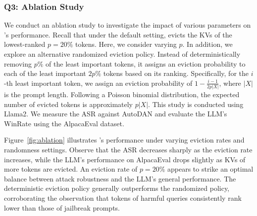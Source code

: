 \subsubsection{Q3: Ablation Study}

We conduct an ablation study to investigate the impact of various parameters on \rkv's performance. Recall that under the default setting, \rkv evicts the KVs of the lowest-ranked $p = 20\%$ tokens. Here, we consider varying $p$. In addition, we explore an alternative randomized eviction policy. Instead of deterministically removing $p\%$ of the least important tokens, it assigns an eviction probability to each of the least important $2p\%$ tokens based on its ranking. Specifically, for the $i$-th least important token, we assign an eviction probability of $1 - \frac{i-1}{2 p |X|}$, where $|X|$ is the prompt length. Following a Poisson binomial distribution, the expected number of evicted tokens is approximately $p|X|$.
This study is conducted using Llama2. We measure the ASR against AutoDAN and evaluate the LLM's WinRate using the AlpacaEval dataset.
 
Figure~\ref{fig:ablation} illustrates \rkv's performance under varying eviction rates and randomness settings. Observe that the ASR decreases sharply as the eviction rate increases, while the LLM's performance on AlpacaEval drops slightly as KVs of more tokens are evicted. An eviction rate of $p = 20\%$ appears to strike an optimal balance between attack robustness and the LLM's general performance.
The deterministic eviction policy generally outperforms the randomized policy, corroborating the observation that tokens of harmful queries consistently rank lower than those of jailbreak prompts.









